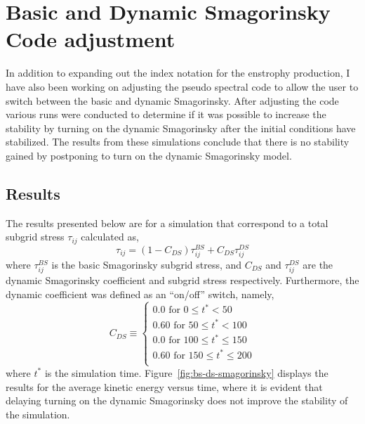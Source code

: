 \section{Basic and Dynamic Smagorinsky Code adjustment}
In addition to expanding out the index notation for the enstrophy
production, I have also been working on adjusting the pseudo spectral code
to allow the user to switch between the basic and dynamic Smagorinsky.
After adjusting the code various runs were conducted to determine if it was
possible to increase the stability by turning on the dynamic Smagorinsky
after the initial conditions have stabilized. The results from these
simulations conclude that there is no stability gained by postponing to
turn on the dynamic Smagorinsky model. 

\subsection{Results}
The results presented below are for a simulation that correspond to a 
total subgrid stress $\tau_{ij}$ calculated as, 
\begin{equation}
    \tau_{ij} = (1-C_{DS})\tau_{ij}^{BS} + C_{DS}\tau_{ij}^{DS}
\end{equation}
where $\tau_{ij}^{BS}$ is the basic Smagorinsky subgrid stress, and
$C_{DS}$ and $\tau_{ij}^{DS}$ are the dynamic Smagorinsky coefficient and
subgrid stress respectively. Furthermore, the dynamic coefficient was defined
as an ``on/off'' switch, namely,
\begin{equation}
    C_{DS} \equiv          
    \begin{cases}
        0.0     \text{ for $0 \leq t^{*} < 50 $}            \\
        0.60    \text{ for $50 \leq t^{*} < 100 $}          \\
        0.0     \text{ for $100 \leq t^{*} \leq 150 $}      \\
        0.60    \text{ for $150 \leq t^{*} \leq 200 $}      \\
    \end{cases}
\end{equation}
where $t^{*}$ is the simulation time. Figure~\ref{fig:bs-ds-smagorinsky}
displays the results for the average kinetic energy versus time, where it
is evident that delaying turning on the dynamic Smagorinsky does not
improve the stability of the simulation.

